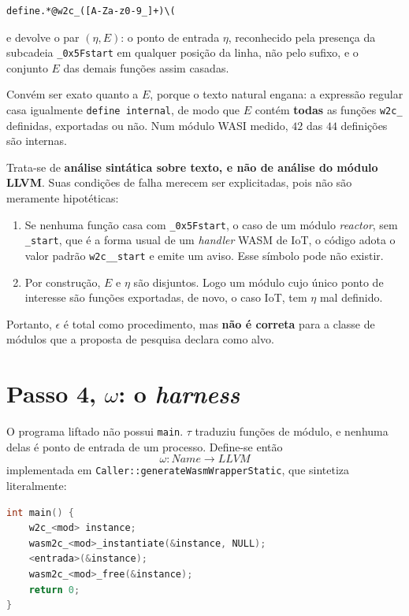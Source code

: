 \documentclass[11pt,a4paper]{article}
\theoremstyle{definition}
\newcommand{\code}[1]{\texttt{#1}}
\begin{document}
\begin{lstlisting}
define.*@w2c_([A-Za-z0-9_]+)\(
\end{lstlisting}

\noindent
e devolve o par $(\eta, E)$: o ponto de entrada $\eta$, reconhecido pela presença
da subcadeia \code{\_0x5Fstart} em qualquer posição da linha, não pelo sufixo,
e o conjunto $E$ das demais funções assim casadas.

Convém ser exato quanto a $E$, porque o texto natural engana: a expressão regular
casa igualmente \code{define internal}, de modo que $E$ contém \textbf{todas} as
funções \code{w2c\_} definidas, exportadas ou não. Num módulo WASI medido, $42$
das $44$ definições são internas.

Trata-se de
\textbf{análise sintática sobre texto, e não de análise do módulo LLVM}. Suas
condições de falha merecem ser explicitadas, pois não são meramente
hipotéticas:

\begin{enumerate}[leftmargin=1.6em]
  \item Se nenhuma função casa com \code{\_0x5Fstart}, o caso de um módulo
        \emph{reactor}, sem \code{\_start}, que é a forma usual de um
        \emph{handler} WASM de IoT, o código adota o valor padrão
        \code{w2c\_\_start} e emite um aviso. Esse símbolo pode não existir.
  \item Por construção, $E$ e $\eta$ são disjuntos. Logo um módulo cujo único
        ponto de interesse são funções exportadas, de novo, o caso IoT, tem
        $\eta$ mal definido.
\end{enumerate}

Portanto, $\epsilon$ é total
como procedimento, mas \textbf{não é correta} para a classe de módulos que a
proposta de pesquisa declara como alvo.

\section{Passo 4, $\omega$: o \emph{harness}}

O programa liftado não possui \code{main}. $\tau$ traduziu funções de módulo, e
nenhuma delas é ponto de entrada de um processo. Define-se então
\[
  \omega : \mathit{Name} \longrightarrow \mathit{LLVM}
\]
implementada em \code{Caller::generateWasmWrapperStatic}, que sintetiza
literalmente:

\begin{lstlisting}[language=C]
int main() {
    w2c_<mod> instance;
    wasm2c_<mod>_instantiate(&instance, NULL);
    <entrada>(&instance);
    wasm2c_<mod>_free(&instance);
    return 0;
}
\end{lstlisting}
\end{document}
